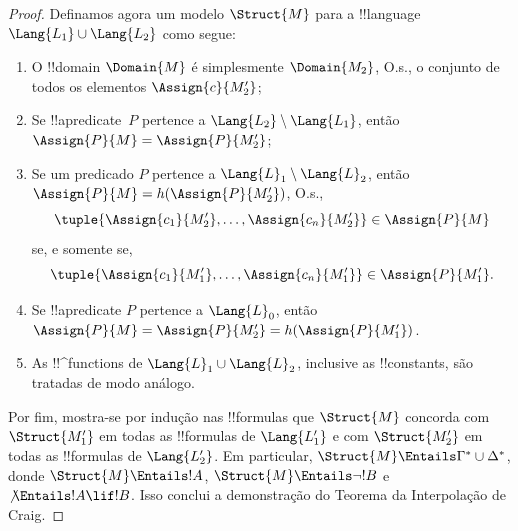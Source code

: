 \documentclass[../../../include/open-logic-section]{subfiles}
\begin{document}
\begin{proof}
Definamos agora um modelo $\Struct{M}$ para a !!{language}
$\Lang{L_1} \cup \Lang{L_2}$ como segue:
\begin{enumerate}
\item O !!{domain} $\Domain{M}$ é simplesmente $\Domain{M_2}$, O.s.\@, o conjunto de todos os elementos $\Assign{c}{M'_2}$;
\item Se !!a{predicate}~$P$ pertence a
  $\Lang{L_2} \setminus \Lang{L_1}$, então
  $\Assign{P}{M} = \Assign{P}{M'_2}$;
\item Se um predicado $P$ pertence a
  $\Lang{L}_1\setminus \Lang{L}_2$, então
  $\Assign{P}{M} = h(\Assign{P}{M'_2})$, O.s.\@,
  \[
  \tuple{\Assign{c_1}{M'_2}, \dots, \Assign{c_n}{M'_2}} \in
  \Assign{P}{M}
  \]
  se, e somente se,
  \[
  \tuple{\Assign{c_1}{M'_1}, \dots, \Assign{c_n}{M'_1}} \in
  \Assign{P}{M'_1}.
  \]
\item Se !!a{predicate} $P$ pertence a $\Lang{L}_0$, então $\Assign{P}{M} =
  \Assign{P}{M'_2} = h(\Assign{P}{M'_1})$. 
\item As !!^{function}s de $\Lang{L}_1 \cup \Lang{L}_2$, inclusive as
  !!{constant}s, são tratadas de modo análogo.
\end{enumerate}

Por fim, mostra-se por indução nas !!{formula}s que $\Struct{M}$
concorda com $\Struct{M'_1}$ em todas as !!{formula}s de $\Lang{L'_1}$
e com $\Struct{M'_2}$ em todas as !!{formula}s de $\Lang{L'_2}$. Em
particular, $\Struct{M} \Entails \Gamma^* \cup \Delta^*$, donde
$\Struct{M} \Entails !A$, $\Struct{M} \Entails \lnot!B$ e
$\not\Entails !A \lif !B$. Isso conclui a demonstração do Teorema da
Interpolação de Craig.
\end{proof}
\end{document}
